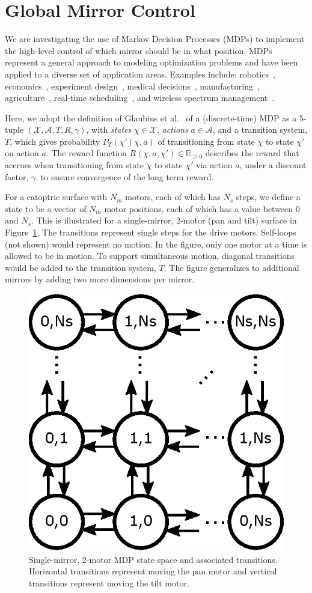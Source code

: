 \section{Global Mirror Control}
\label{sec:mdp}

We are investigating the use of Markov Decision Processes (MDPs) to
implement the high-level control of which mirror should be in what position.
MDPs represent a general approach to modeling optimization
problems and have been applied to a diverse set of
application areas. Examples include: robotics~\cite{ab10},
economics~\cite{bs98}, experiment design~\cite{White93},
medical decisions~\cite{ahsr10}, manufacturing~\cite{yyl04},
agriculture~\cite{Kristensen03},
real-time scheduling~\cite{gtsg08},
and wireless spectrum management~\cite{mgc16}.

Here, we adopt the definition of Glaubius et al.~\cite{gtsg08}
of a (discrete-time) MDP as a 5-tuple
$(\mathcal{X}, \mathcal{A}, T, R, \gamma)$, with \emph{states}
$\chi \in \mathcal{X}$, \emph{actions} $a \in \mathcal{A}$,
and a transition system, $T$, which gives probability
$P_T (\chi' \mid \chi, a)$ of transitioning from state $\chi$ to
state $\chi'$ on action $a$.
The reward function $R(\chi, a, \chi') \in \mathbb R_{\ge 0}$ describes the
reward that accrues when transitioning from state $\chi$ to
state $\chi'$ via action $a$, under a discount factor, $\gamma$,
to ensure convergence of the long term reward.

For a catoptric surface with $N_m$ motors, each of which has $N_s$
steps, we define a state to be a vector of $N_m$ motor positions,
each of which has a value between 0 and $N_s$.  This is illustrated
for a single-mirror, 2-motor (pan and tilt) surface in Figure~\ref{fig:mdp2}.
The transitions represent single steps for the drive motors.
Self-loops (not shown) would represent no motion.  In the figure,
only one motor at a time is allowed to be in motion.  To support simultaneous
motion, diagonal transitions would be added to the transition system, $T$.
The figure generalizes to additional mirrors by adding two
more dimensions per mirror.

\begin{figure}[ht]
\centering
\includegraphics[width=0.6\columnwidth]{mdp2}
\caption{Single-mirror, 2-motor MDP state space and associated transitions.
Horizontal transitions represent moving the pan motor and vertical transitions
represent moving the tilt motor.}
\label{fig:mdp2}
\end{figure}


